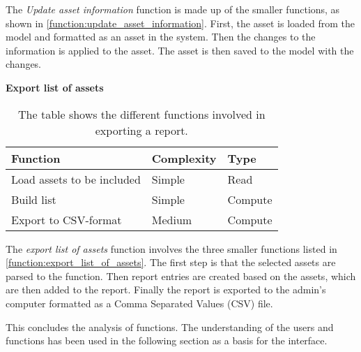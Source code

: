 The \textit{Update asset information} function is made up of the smaller functions, as shown in \autoref{function:update_asset_information}. First, the asset is loaded from the model and formatted as an asset in the system. Then the changes to the information is applied to the asset. The asset is then saved to the model with the changes.

\begin{center}
    \textbf{Export list of assets}
\end{center}

\begin{table}[H]
    \centering
        \begin{tabular}{|l|l|l|}
            \hline
            \textbf{Function} & \textbf{Complexity} & \textbf{Type}\\
            \hline
            \hline
            Load assets to be included & Simple & Read \\
            \hline
            Build list & Simple & Compute \\
            \hline
            Export to CSV-format & Medium & Compute \\
            \hline
        \end{tabular}
    \caption{The table shows the different functions involved in exporting a report.}
    \label{function:export_list_of_assets}
\end{table}

The \textit{export list of assets} function involves the three smaller functions listed in \autoref{function:export_list_of_assets}. The first step is that the selected assets are parsed to the function. Then report entries are created based on the assets, which are then added to the report. Finally the report is exported to the admin's computer formatted as a Comma Separated Values (CSV) file.
\par
This concludes the analysis of functions. The understanding of the users and functions has been used in the following section as a basis for the interface.